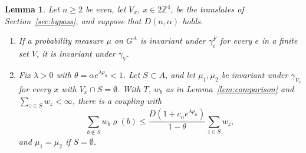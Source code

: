 \documentclass[11pt]{amsart}
\newtheorem{lemma}[theorem]{Lemma}
\theoremstyle{definition}
\theoremstyle{remark}
\numberwithin{equation}{section}
\newcommand{\Z}{\mathbb{Z}}
\begin{document}
\begin{lemma}\label{lem:dscomparison}
Let $n\ge2$ be even, let $V_x$, $x\in2\Z^4$, be the translates of
Section~\ref{sec:bypass}, and suppose that $D(n,\alpha)$ holds.
\begin{enumerate}[label=\textup{(\alph*)},leftmargin=*]
\item If a probability measure $\mu$ on $G^A$ is invariant under
$\gamma^F_e$ for every $e$ in a finite set $V$, it is invariant under
$\gamma_V$.
\item Fix $\lambda>0$ with $\theta=\alpha e^{\lambda\rho_n}<1$. Let $S\subset
A$, and let $\mu_1,\mu_2$ be invariant under $\gamma_{V_x}$ for every $x$
with $V_x\cap S=\emptyset$. With $T$, $w_b$ as in Lemma~\ref{lem:comparison}
and $\sum_{z\in S}w_z<\infty$, there is a coupling with
\[
\sum_{b\notin S}w_b\varrho(b)\le\frac{D(1+c_ne^{\lambda\rho_n})}{1-\theta}
\sum_{z\in S}w_z ,
\]
and $\mu_1=\mu_2$ if $S=\emptyset$.
\end{enumerate}
\end{lemma}
\end{document}
